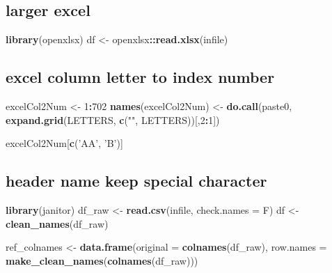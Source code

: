 \documentclass[
]{book}
\newenvironment{Shaded}{\begin{snugshade}}{\end{snugshade}}
\newcommand{\DataTypeTok}[1]{\textcolor[rgb]{0.13,0.29,0.53}{#1}}
\newcommand{\DecValTok}[1]{\textcolor[rgb]{0.00,0.00,0.81}{#1}}
\newcommand{\KeywordTok}[1]{\textcolor[rgb]{0.13,0.29,0.53}{\textbf{#1}}}
\newcommand{\NormalTok}[1]{#1}
\newcommand{\OperatorTok}[1]{\textcolor[rgb]{0.81,0.36,0.00}{\textbf{#1}}}
\newcommand{\StringTok}[1]{\textcolor[rgb]{0.31,0.60,0.02}{#1}}
\begin{document}
\hypertarget{larger-excel}{%
\subsection{larger excel}\label{larger-excel}}

\begin{Shaded}
\begin{Highlighting}[]
\KeywordTok{library}\NormalTok{(openxlsx)}
\NormalTok{df <-}\StringTok{ }\NormalTok{openxlsx}\OperatorTok{::}\KeywordTok{read.xlsx}\NormalTok{(infile)}
\end{Highlighting}
\end{Shaded}

\hypertarget{excel-column-letter-to-index-number}{%
\subsection{excel column letter to index number}\label{excel-column-letter-to-index-number}}

\begin{Shaded}
\begin{Highlighting}[]
\NormalTok{excelCol2Num <-}\StringTok{ }\DecValTok{1}\OperatorTok{:}\DecValTok{702}
\KeywordTok{names}\NormalTok{(excelCol2Num) <-}\StringTok{ }\KeywordTok{do.call}\NormalTok{(paste0, }\KeywordTok{expand.grid}\NormalTok{(LETTERS, }\KeywordTok{c}\NormalTok{(}\StringTok{""}\NormalTok{, LETTERS))[,}\DecValTok{2}\OperatorTok{:}\DecValTok{1}\NormalTok{])}

\NormalTok{excelCol2Num[}\KeywordTok{c}\NormalTok{(}\StringTok{'AA'}\NormalTok{, }\StringTok{'B'}\NormalTok{)]}
\end{Highlighting}
\end{Shaded}

\hypertarget{header-name-keep-special-character}{%
\subsection{header name keep special character}\label{header-name-keep-special-character}}

\begin{Shaded}
\begin{Highlighting}[]
\KeywordTok{library}\NormalTok{(janitor)}
\NormalTok{df_raw <-}\StringTok{ }\KeywordTok{read.csv}\NormalTok{(infile, }\DataTypeTok{check.names =}\NormalTok{ F)}
\NormalTok{df <-}\StringTok{ }\KeywordTok{clean_names}\NormalTok{(df_raw)}

\NormalTok{ref_colnames <-}\StringTok{ }\KeywordTok{data.frame}\NormalTok{(}\DataTypeTok{original =} \KeywordTok{colnames}\NormalTok{(df_raw), }
                           \DataTypeTok{row.names =} \KeywordTok{make_clean_names}\NormalTok{(}\KeywordTok{colnames}\NormalTok{(df_raw)))}
\end{Highlighting}
\end{Shaded}
\end{document}
